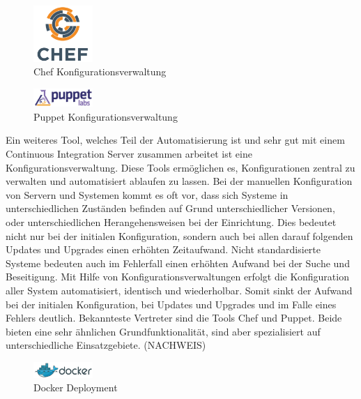 \begin{figure}[ht]
  \centering
  \includegraphics[width=0.2\textwidth]{img/chef_logo.png}
  \caption{Chef Konfigurationsverwaltung \parencite[][]{Chef:2016}}
  \label{fig:scrummodell}
\end{figure}

\begin{figure}[ht]
  \centering
  \includegraphics[width=0.2\textwidth]{img/puppet_logo.png}
  \caption{Puppet Konfigurationsverwaltung \parencite[][]{Puppet:2016}}
  \label{fig:scrummodell}
\end{figure}

Ein weiteres Tool, welches Teil der Automatisierung ist und sehr gut mit einem Continuous Integration Server zusammen arbeitet ist eine Konfigurationsverwaltung. Diese Tools ermöglichen es, Konfigurationen zentral zu verwalten und automatisiert ablaufen zu lassen. Bei der manuellen Konfiguration von Servern und Systemen kommt es oft vor, dass sich Systeme in unterschiedlichen Zuständen befinden auf Grund unterschiedlicher Versionen, oder unterschiedlichen Herangehensweisen bei der Einrichtung. Dies bedeutet nicht nur bei der initialen Konfiguration, sondern auch bei allen darauf folgenden Updates und Upgrades einen erhöhten Zeitaufwand. Nicht standardisierte Systeme bedeuten auch im Fehlerfall einen erhöhten Aufwand bei der Suche und Beseitigung. Mit Hilfe von Konfigurationsverwaltungen erfolgt die Konfiguration aller System automatisiert, identisch und wiederholbar. Somit sinkt der Aufwand bei der initialen Konfiguration, bei Updates und Upgrades und im Falle eines Fehlers deutlich. Bekannteste Vertreter sind die Tools Chef und Puppet. Beide bieten eine sehr ähnlichen Grundfunktionalität, sind aber spezialisiert auf unterschiedliche Einsatzgebiete. (NACHWEIS)

\begin{figure}[ht]
  \centering
  \includegraphics[width=0.2\textwidth]{img/docker_logo.png}
  \caption{Docker Deployment \parencite[][]{Docker:2016}}
  \label{fig:scrummodell}
\end{figure}

